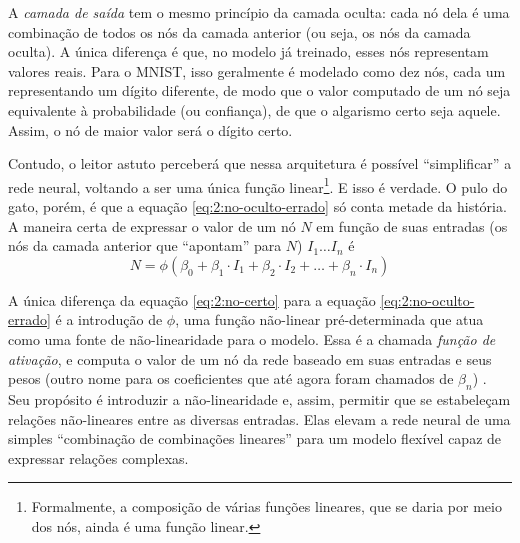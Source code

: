 A \textit{camada de saída} tem o mesmo princípio da camada oculta: cada nó dela é uma combinação de todos os nós da camada anterior (ou seja, os nós da camada oculta).
A única diferença é que, no modelo já treinado, esses nós representam valores reais.
Para o MNIST, isso geralmente é modelado como dez nós, cada um representando um dígito diferente, de modo que o valor computado de um nó seja equivalente à probabilidade (ou confiança), de que o algarismo certo seja aquele.
Assim, o nó de maior valor será o dígito certo.

Contudo, o leitor astuto perceberá que nessa arquitetura é possível ``simplificar'' a rede neural, voltando a ser uma única função linear\footnote{Formalmente, a composição de várias funções lineares, que se daria por meio dos nós, ainda é uma função linear.}.
E isso é verdade.
O pulo do gato, porém, é que a equação \ref{eq:2:no-oculto-errado} só conta metade da história.
A maneira certa de expressar o valor de um nó $N$ em função de suas entradas (os nós da camada anterior que ``apontam'' para $N$) $I_1 \dots I_n$ é
\begin{equation}
\label{eq:2:no-certo}
N = \phi (\beta_0 + \beta_1 \cdot I_1 + \beta_2 \cdot I_2 + \dots + \beta_n \cdot I_n)
\end{equation}

A única diferença da equação \ref{eq:2:no-certo} para a equação \ref{eq:2:no-oculto-errado} é a introdução de $\phi$, uma função não-linear pré-determinada que atua como uma fonte de não-linearidade para o modelo.
Essa é a chamada \textit{função de ativação}, e computa o valor de um nó da rede baseado em suas entradas e seus pesos (outro nome para os coeficientes que até agora foram chamados de $\beta_n$) \cite{james_introduction_2021a}.
Seu propósito é introduzir a não-linearidade e, assim, permitir que se estabeleçam relações não-lineares entre as diversas entradas.
Elas elevam a rede neural de uma simples ``combinação de combinações lineares'' para um modelo flexível capaz de expressar relações complexas.

